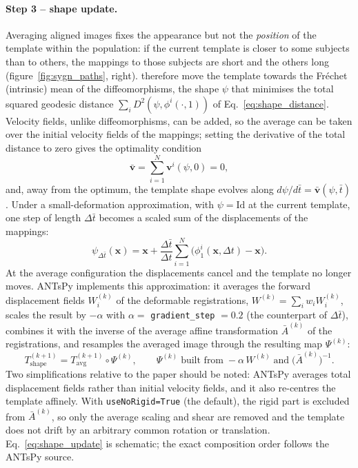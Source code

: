 \paragraph{Step 3 -- shape update.}  %
Averaging aligned images fixes the appearance but not the \emph{position} of the
template within the population: if the current template is closer to some
subjects than to others, the mappings to those subjects are short and the others
long (figure~\ref{fig:sygn_paths}, right). \citet{avants2010sygn} therefore move the template towards the Fréchet
(intrinsic) mean of the diffeomorphisms, the shape $\psi$ that minimises the total
squared geodesic distance $\sum_i D^2(\psi,\phi^i(\cdot,1))$ of
Eq.~\eqref{eq:shape_distance}. Velocity fields, unlike diffeomorphisms, can be
added, so the average can be taken over the initial velocity fields of the
mappings; setting the derivative of the total distance to zero gives the
optimality condition
\begin{equation}
  \bar{\mathbf{v}} = \sum_{i=1}^{N} \mathbf{v}^i(\psi,0) = 0,
  \label{eq:frechet_condition}   %
\end{equation}
and, away from the optimum, the template shape evolves along
$d\psi/d\bar t = \bar{\mathbf{v}}(\psi,\bar t)$. Under a small-deformation
approximation, with $\psi=\mathrm{Id}$ at the current template, one step of
length $\Delta\bar t$ becomes a scaled sum of the displacements of the mappings:
\begin{equation}
  \psi_{\Delta\bar t}(\mathbf{x})
  = \mathbf{x} + \frac{\Delta\bar t}{\Delta t}
    \sum_{i=1}^{N} \big( \phi^i_1(\mathbf{x},\Delta t) - \mathbf{x} \big).
  \label{eq:shape_step}          %
\end{equation}
At the average configuration the displacements cancel and the template no longer
moves. ANTsPy implements this approximation: it averages the forward
displacement fields $W_i^{(k)}$ of the deformable registrations,
$W^{(k)}=\sum_i w_i W_i^{(k)}$, scales the result by $-\alpha$ with
$\alpha=$ \texttt{gradient\_step} $=0.2$ (the counterpart of $\Delta\bar t$),
combines it with the inverse of the average affine transformation
$\bar A^{(k)}$ of the registrations, and resamples the averaged image through the
resulting map $\Psi^{(k)}$:
\begin{equation}
  T^{(k+1)}_{\mathrm{shape}} = T_{\mathrm{avg}}^{(k+1)} \circ \Psi^{(k)},
  \qquad
  \Psi^{(k)} \;\text{built from}\; -\alpha\,W^{(k)} \;\text{and}\; \big(\bar A^{(k)}\big)^{-1}.
  \label{eq:shape_update}        %
\end{equation}
Two simplifications relative to the paper should be noted: ANTsPy averages total
displacement fields rather than initial velocity fields, and it also re-centres
the template affinely. With \texttt{useNoRigid=True} (the default), the rigid
part is excluded from $\bar A^{(k)}$, so only the average scaling and shear are
removed and the template does not drift by an arbitrary common rotation or
translation. Eq.~\eqref{eq:shape_update} is schematic; the exact composition
order follows the ANTsPy source.

